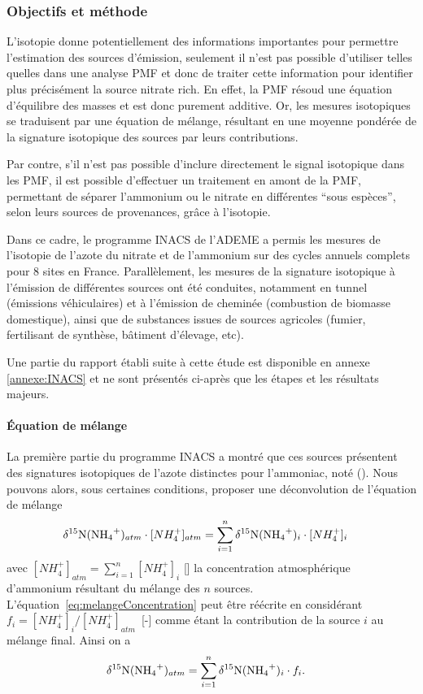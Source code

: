 \subsubsection{Objectifs et méthode}%
\label{ssub:objectif_et_methode}

L'isotopie donne potentiellement des informations importantes pour permettre l'estimation
des sources d'émission, seulement il n'est pas possible d'utiliser telles quelles dans une
analyse PMF et donc de traiter cette information pour identifier plus précisément la
source nitrate rich.  En effet, la PMF résoud une équation d'équilibre des masses et est
donc purement additive. Or, les mesures isotopiques se traduisent par une équation de
mélange, résultant en une moyenne pondérée de la signature isotopique des sources par
leurs contributions.

Par contre, s'il n'est pas possible d'inclure directement le signal isotopique dans les
PMF, il est possible d'effectuer un traitement en amont de la PMF, permettant de séparer
l'ammonium ou le nitrate en différentes ``sous espèces'', selon leurs sources de
provenances, grâce à l'isotopie.

Dans ce cadre, le programme INACS de l'ADEME a permis les mesures de l'isotopie de l'azote
du nitrate et de l'ammonium sur des cycles annuels complets pour 8 sites en France.
Parallèlement, les mesures de la signature isotopique à l'émission de différentes sources
ont été conduites, notamment en tunnel (émissions véhiculaires) et à l'émission de
cheminée (combustion de biomasse domestique), ainsi que de substances issues de sources
agricoles (fumier, fertilisant de synthèse, bâtiment d'élevage, etc).

Une partie du rapport établi suite à cette étude est disponible en annexe
\ref{annexe:INACS} et ne sont présentés ci-après que les étapes et les résultats majeurs.

\paragraph{Équation de mélange}%
\label{par:équation_de_mélange}

La première partie du programme INACS a montré que ces sources présentent des signatures
isotopiques de l'azote distinctes pour l'ammoniac, noté \dN(\NHq).
Nous pouvons alors, sous certaines conditions, proposer une déconvolution de l'équation de mélange
\begin{align}
    \dN(\NHq)_{atm} \cdot [NH_4^+]_{atm} &= \sum_{i=1}^{n} \dN(\NHq)_i \cdot [NH_4^+]_i
    \label{eq:melangeConcentration}
\end{align}
avec $[NH_4^+]_{atm} = \sum_{i=1}^n [NH_4^+]_i$ [\si{\ugm}] la concentration atmosphérique
d'ammonium résultant du mélange des $n$ sources.  L'équation~\ref{eq:melangeConcentration}
peut être réécrite en considérant $f_i = [NH_4^+]_i / [NH_4^+]_{atm}$~[-] comme étant la
contribution de la source $i$ au mélange final. Ainsi on a
\begin{align}
    \dN(\NHq)_{atm} &= \sum_{i=1}^n \dN(\NHq)_i \cdot f_i. 
    \label{eq:melangeContrib}
\end{align}

